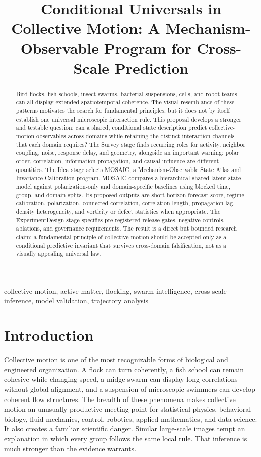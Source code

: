 \documentclass[conference]{../../../../Conference-LaTeX-template_10-17-19/IEEEtran}
\title{Conditional Universals in Collective Motion: A Mechanism-Observable Program for Cross-Scale Prediction}
\author{\IEEEauthorblockN{Research Proposal}\IEEEauthorblockA{Evidence-bounded four-agent synthesis | Design-only study plan}}
\begin{document}
\maketitle
\begin{abstract}
Bird flocks, fish schools, insect swarms, bacterial suspensions, cells, and robot teams can all display extended spatiotemporal coherence. The visual resemblance of these patterns motivates the search for fundamental principles, but it does not by itself establish one universal microscopic interaction rule. This proposal develops a stronger and testable question: can a shared, conditional state description predict collective-motion observables across domains while retaining the distinct interaction channels that each domain requires? The Survey stage finds recurring roles for activity, neighbor coupling, noise, response delay, and geometry, alongside an important warning: polar order, correlation, information propagation, and causal influence are different quantities. The Idea stage selects MOSAIC, a Mechanism-Observable State Atlas and Invariance Calibration program. MOSAIC compares a hierarchical shared latent-state model against polarization-only and domain-specific baselines using blocked time, group, and domain splits. Its proposed outputs are short-horizon forecast score, regime calibration, polarization, connected correlation, correlation length, propagation lag, density heterogeneity, and vorticity or defect statistics when appropriate. The ExperimentDesign stage specifies pre-registered release gates, negative controls, ablations, and governance requirements. The result is a direct but bounded research claim: a fundamental principle of collective motion should be accepted only as a conditional predictive invariant that survives cross-domain falsification, not as a visually appealing universal law.
\end{abstract}
\begin{IEEEkeywords}
collective motion, active matter, flocking, swarm intelligence, cross-scale inference, model validation, trajectory analysis
\end{IEEEkeywords}

\section{Introduction}
Collective motion is one of the most recognizable forms of biological and engineered organization. A flock can turn coherently, a fish school can remain cohesive while changing speed, a midge swarm can display long correlations without global alignment, and a suspension of microscopic swimmers can develop coherent flow structures. The breadth of these phenomena makes collective motion an unusually productive meeting point for statistical physics, behavioral biology, fluid mechanics, control, robotics, applied mathematics, and data science. It also creates a familiar scientific danger. Similar large-scale images tempt an explanation in which every group follows the same local rule. That inference is much stronger than the evidence warrants.
\end{document}
